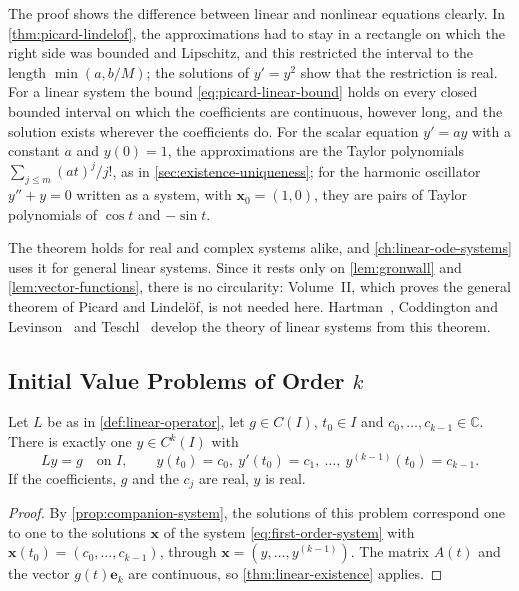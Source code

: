 The proof shows the difference between linear and nonlinear equations clearly. In \cref{thm:picard-lindelof}, the approximations had to stay in a rectangle on which the right side was bounded and Lipschitz, and this restricted the interval to the length $\min(a,b/M)$; the solutions of $y'=y^2$ show that the restriction is real. For a linear system the bound \eqref{eq:picard-linear-bound} holds on every closed bounded interval on which the coefficients are continuous, however long, and the solution exists wherever the coefficients do. For the scalar equation $y'=ay$ with a constant $a$ and $y(0)=1$, the approximations are the Taylor polynomials $\sum_{j\le m}(at)^j/j!$, as in \cref{sec:existence-uniqueness}; for the harmonic oscillator $y''+y=0$ written as a system, with $\mathbf x_0=(1,0)$, they are pairs of Taylor polynomials of $\cos t$ and $-\sin t$.

The theorem holds for real and complex systems alike, and \cref{ch:linear-ode-systems} uses it for general linear systems. Since it rests only on \cref{lem:gronwall} and \cref{lem:vector-functions}, there is no circularity: Volume~II, which proves the general theorem of Picard and Lindel\"of, is not needed here. Hartman~\cite[Chap.~IV]{hartman2002}, Coddington and Levinson~\cite[Chap.~3]{coddington1955} and Teschl~\cite[Chap.~3]{teschl2012} develop the theory of linear systems from this theorem.

\subsection{Initial Value Problems of Order \texorpdfstring{$k$}{k}}

\begin{corollary}
\label{cor:higher-existence}
Let $L$ be as in \cref{def:linear-operator}, let $g\in C(I)$, $t_0\in I$ and $c_0,\ldots,c_{k-1}\in\mathbb C$. There is exactly one $y\in C^k(I)$ with
\[
Ly=g\quad\text{on }I,\qquad y(t_0)=c_0,\ y'(t_0)=c_1,\ \ldots,\ y^{(k-1)}(t_0)=c_{k-1} .
\]
If the coefficients, $g$ and the $c_j$ are real, $y$ is real.
\end{corollary}

\begin{proof}
By \cref{prop:companion-system}, the solutions of this problem correspond one to one to the solutions $\mathbf x$ of the system \eqref{eq:first-order-system} with $\mathbf x(t_0)=(c_0,\ldots,c_{k-1})$, through $\mathbf x=(y,\ldots,y^{(k-1)})$. The matrix $A(t)$ and the vector $g(t)\mathbf e_k$ are continuous, so \cref{thm:linear-existence} applies.
\end{proof}

